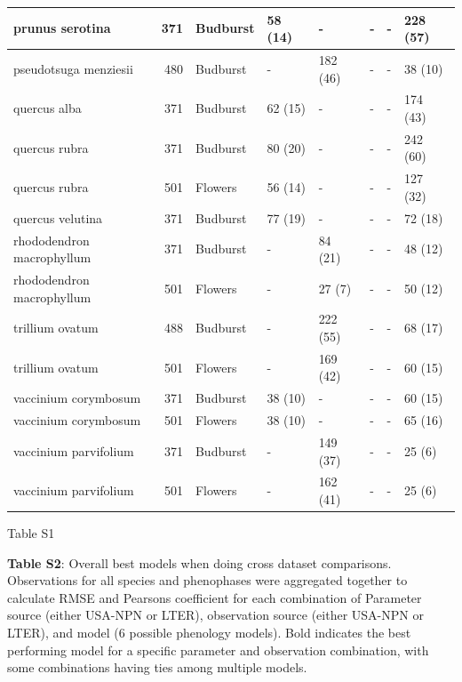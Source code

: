 \documentclass[a4paper,12pt]{article}
\begin{document}
\begin{tabular}{l|r|l|l|l|l|l|l}
\hline
prunus serotina & 371 & Budburst & 58 (14) & - & - & - & 228 (57)\\
\hline
pseudotsuga menziesii & 480 & Budburst & - & 182 (46) & - & - & 38 (10)\\
\hline
quercus alba & 371 & Budburst & 62 (15) & - & - & - & 174 (43)\\
\hline
quercus rubra & 371 & Budburst & 80 (20) & - & - & - & 242 (60)\\
\hline
quercus rubra & 501 & Flowers & 56 (14) & - & - & - & 127 (32)\\
\hline
quercus velutina & 371 & Budburst & 77 (19) & - & - & - & 72 (18)\\
\hline
rhododendron macrophyllum & 371 & Budburst & - & 84 (21) & - & - & 48 (12)\\
\hline
rhododendron macrophyllum & 501 & Flowers & - & 27 (7) & - & - & 50 (12)\\
\hline
trillium ovatum & 488 & Budburst & - & 222 (55) & - & - & 68 (17)\\
\hline
trillium ovatum & 501 & Flowers & - & 169 (42) & - & - & 60 (15)\\
\hline
vaccinium corymbosum & 371 & Budburst & 38 (10) & - & - & - & 60 (15)\\
\hline
vaccinium corymbosum & 501 & Flowers & 38 (10) & - & - & - & 65 (16)\\
\hline
vaccinium parvifolium & 371 & Budburst & - & 149 (37) & - & - & 25 (6)\\
\hline
vaccinium parvifolium & 501 & Flowers & - & 162 (41) & - & - & 25 (6)\\
\hline
\end{tabular}
\newline
Table S1 \newline

\newpage
\normalsize
\textbf{Table S2}: Overall best models when doing cross dataset comparisons. Observations for all species and phenophases were aggregated together to calculate RMSE and Pearsons coefficient for each combination of Parameter source (either USA-NPN or LTER), observation source (either USA-NPN or LTER), and model (6 possible phenology models). Bold indicates the best performing model for a specific parameter and observation combination, with some combinations having ties among multiple models.  

\newpage
\end{document}

